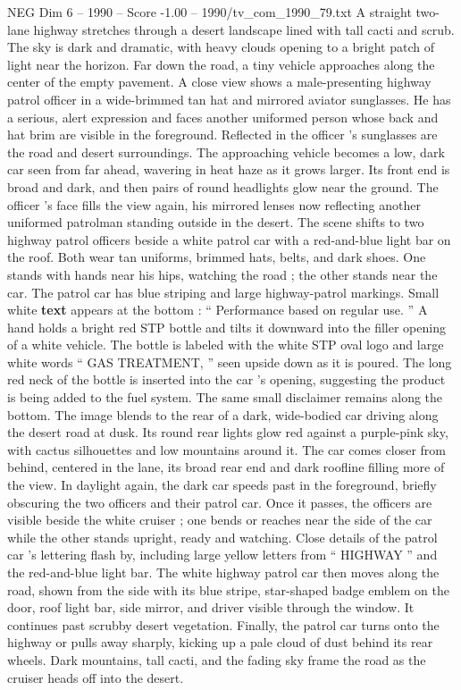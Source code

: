 \begin{textsample}{NEG Dim 6 – 1990 – Score -1.00 – 1990/tv\_com\_1990\_79.txt}  \label{ex:f6_neg_030}
A straight two-lane highway stretches through a desert landscape lined with tall cacti and scrub.
The sky is dark and dramatic, with heavy clouds opening to a bright patch of light near the horizon.
Far down the road, a tiny vehicle approaches along the center of the empty pavement.
A close view shows a male-presenting highway patrol officer in a wide-brimmed tan hat and mirrored aviator sunglasses.
He has a serious, alert expression and faces another uniformed person whose back and hat brim are visible in the foreground.
Reflected in the officer ’s sunglasses are the road and desert surroundings.
The approaching vehicle becomes a low, dark car seen from far ahead, wavering in heat haze as it grows larger.
Its front end is broad and dark, and then pairs of round headlights glow near the ground.
The officer ’s face fills the view again, his mirrored lenses now reflecting another uniformed patrolman standing outside in the desert.
The scene shifts to two highway patrol officers beside a white patrol car with a red-and-blue light bar on the roof.
Both wear tan uniforms, brimmed hats, belts, and dark shoes.
One stands with hands near his hips, watching the road ; the other stands near the car.
The patrol car has blue striping and large highway-patrol markings.
Small white \textbf{text} appears at the bottom : “ Performance based on regular use. ” A hand holds a bright red STP bottle and tilts it downward into the filler opening of a white vehicle.
The bottle is labeled with the white STP oval logo and large white words “ GAS TREATMENT, ” seen upside down as it is poured.
The long red neck of the bottle is inserted into the car ’s opening, suggesting the product is being added to the fuel system.
The same small disclaimer remains along the bottom.
The image blends to the rear of a dark, wide-bodied car driving along the desert road at dusk.
Its round rear lights glow red against a purple-pink sky, with cactus silhouettes and low mountains around it.
The car comes closer from behind, centered in the lane, its broad rear end and dark roofline filling more of the view.
In daylight again, the dark car speeds past in the foreground, briefly obscuring the two officers and their patrol car.
Once it passes, the officers are visible beside the white cruiser ; one bends or reaches near the side of the car while the other stands upright, ready and watching.
Close details of the patrol car ’s lettering flash by, including large yellow letters from “ HIGHWAY ” and the red-and-blue light bar.
The white highway patrol car then moves along the road, shown from the side with its blue stripe, star-shaped badge emblem on the door, roof light bar, side mirror, and driver visible through the window.
It continues past scrubby desert vegetation.
Finally, the patrol car turns onto the highway or pulls away sharply, kicking up a pale cloud of dust behind its rear wheels.
Dark mountains, tall cacti, and the fading sky frame the road as the cruiser heads off into the desert.

\end{textsample}
